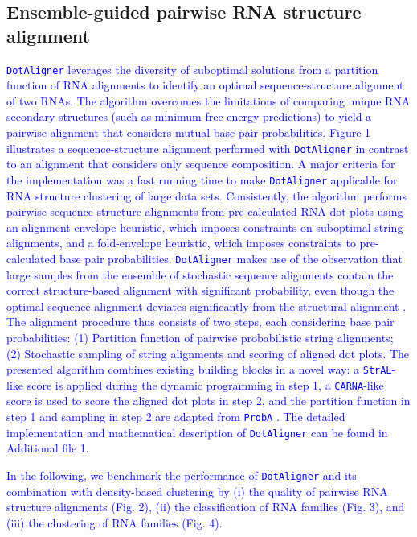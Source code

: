 \documentclass{bmcart}
\newcommand\dotaligner{\texttt{DotAligner}}
\newcommand\carna{\texttt{CARNA}}
\begin{document}
\subsection*{Ensemble-guided pairwise RNA structure alignment} 
 
\textcolor{blue}{
\dotaligner{} leverages the diversity of suboptimal solutions from a partition
function of RNA alignments to identify an optimal sequence-structure alignment
of two RNAs. The algorithm overcomes the limitations of comparing unique RNA
secondary structures (such as minimum free energy predictions) to yield a
pairwise alignment that considers mutual base pair probabilities. Figure 1
illustrates a sequence-structure alignment performed with \dotaligner{} in
contrast to an alignment that considers only sequence composition. A major
criteria for the implementation was a fast running time to make \dotaligner{}
applicable for RNA structure clustering of large data sets. Consistently, the
algorithm performs pairwise sequence-structure alignments from pre-calculated
RNA dot plots using an alignment-envelope heuristic, which imposes constraints
on suboptimal string alignments, and a fold-envelope heuristic, which imposes
constraints to pre-calculated base pair probabilities. \dotaligner{} makes use
of the observation that large samples from the ensemble of stochastic sequence
alignments contain the correct structure-based alignment with significant
probability, even though the optimal sequence alignment deviates significantly
from the structural alignment \cite{Muckstein12385998}. The alignment procedure
thus consists of two steps, each considering base pair probabilities:
(1) Partition function of pairwise probabilistic string alignments; 
(2) Stochastic sampling of string alignments and scoring of aligned dot plots.
The presented algorithm combines existing
building blocks in a novel way: a \texttt{StrAL}-like score is applied during the dynamic programming in step 1, a \carna-like score is used to score the aligned dot plots in step 2, and the partition
function in step 1 and sampling in step 2 are adapted
from \texttt{ProbA} \cite{Muckstein12385998}.
The detailed implementation and mathematical description of
\dotaligner{} can be found in Additional file 1.\\
}

\textcolor{blue}{
In the following, we benchmark the performance of \dotaligner{} and its combination with
density-based clustering by (i) the quality of pairwise RNA structure
alignments (Fig. 2), (ii) the classification of RNA families (Fig. 3), and (iii)
the clustering of RNA families (Fig. 4).\\
}
\end{document}
